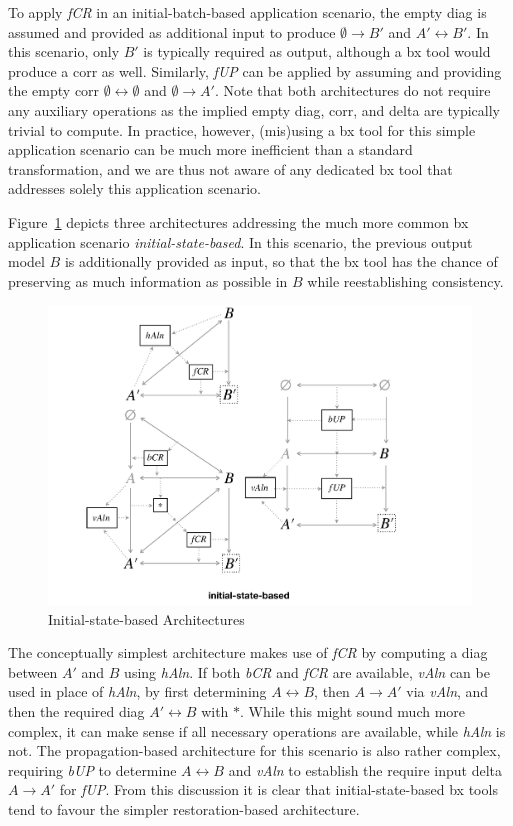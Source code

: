 %
To apply \emph{fCR} in an initial-batch-based application scenario, the empty diag is assumed and provided as additional input to produce $\emptyset \rightarrow B'$ and $A' \leftrightarrow B'$.
In this scenario, only $B'$ is typically required as output, although a bx tool would produce a corr as well.
%
Similarly, \emph{fUP} can be applied by assuming and providing the empty corr $\emptyset \leftrightarrow \emptyset$ and $\emptyset \rightarrow A'$.
%
Note that both architectures do not require any auxiliary operations as the implied empty diag, corr, and delta are typically trivial to compute.
In practice, however, (mis)using a bx tool for this simple application scenario can be much more inefficient than a standard transformation, and we are thus not aware of any dedicated bx tool that addresses solely this application scenario. 

Figure~\ref{fig:initialStateBased} depicts three architectures addressing the much more common bx application scenario \emph{initial-state-based}.
In this scenario, the previous output model $B$ is additionally provided as input, so that the bx tool has the chance of preserving as much information as possible in $B$ while reestablishing consistency.
%
\begin{figure}[tb!]
	\centering
	\includegraphics[width=\columnwidth]{diagrams/foundations//initial-state-based}
	\caption{Initial-state-based Architectures}
	\label{fig:initialStateBased}
\end{figure}
%
The conceptually simplest architecture makes use of \emph{fCR} by computing a diag between $A'$ and $B$ using \emph{hAln}.
%
If both \emph{bCR} and \emph{fCR} are available, \emph{vAln} can be used in place of \emph{hAln}, by first determining $A \leftrightarrow B$, then $A \rightarrow A'$ via \emph{vAln}, and then the required diag $A' \leftrightarrow B$ with $\ast$.
While this might sound much more complex, it can make sense if all necessary operations are available, while \emph{hAln} is not.
%
The propagation-based architecture for this scenario is also rather complex, requiring \emph{bUP} to determine $A \leftrightarrow B$ and \emph{vAln} to establish the require input delta $A \rightarrow A'$ for \emph{fUP}.
%
From this discussion it is clear that initial-state-based bx tools tend to favour the simpler restoration-based architecture.

